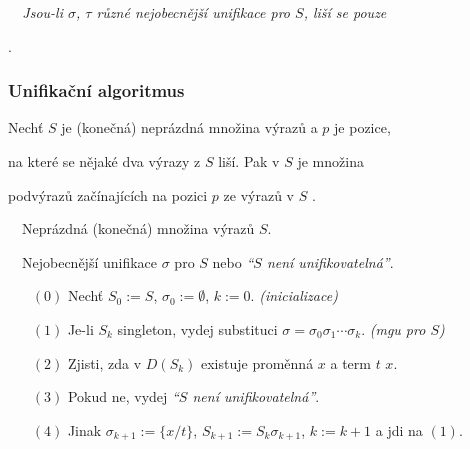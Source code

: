     \smallskip
    
    \smallskip
    
    \bigskip
    
    {\it {}\ \ Jsou-li $\sigma$, $\tau$ různé nejobecnější unifikace pro $S$, liší se pouze
    \smallskip
    
    .}
    
    
    
    \subsubsection*{Unifikační algoritmus}
    Nechť $S$ je (konečná) neprázdná množina výrazů a $p$ je  pozice,
    \smallskip
    
    na které se nějaké dva výrazy z $S$ liší. Pak  v $S$ je množina 
    \smallskip
    
    podvýrazů začínajících na pozici $p$ ze  výrazů v $S$ .
    \medskip
    
    \bigskip
    
    {\it {}}\ \ Neprázdná (konečná) množina výrazů $S$.
    \smallskip
    
    {\it {}}\ \ Nejobecnější unifikace $\sigma$ pro $S$ nebo \emph{``$S$ není unifikovatelná''}.
    
    \begin{enumerate}
    \item[$(0)$] Nechť $S_0:=S$, $\sigma_0:=\emptyset$, $k:=0$. \hfill\emph{(inicializace)}
    \smallskip
    
    \item[$(1)$] Je-li $S_k$ singleton, vydej substituci $\sigma=\sigma_0\sigma_1\cdots \sigma_k$. \hfill\emph{(mgu pro $S$)}
    \smallskip
    
    \item[$(2)$] Zjisti, zda v $D(S_k)$ existuje proměnná $x$ a term $t$  $x$.
    \smallskip
    
    \item[$(3)$] Pokud ne, vydej \emph{``$S$ není unifikovatelná''}.
    \smallskip
    
    \item[$(4)$] Jinak $\sigma_{k+1}:=\{x/t\}$, $S_{k+1}:=S_k\sigma_{k+1}$, $k:=k+1$ a jdi na $(1)$.
    \end{enumerate}
    \smallskip
    
